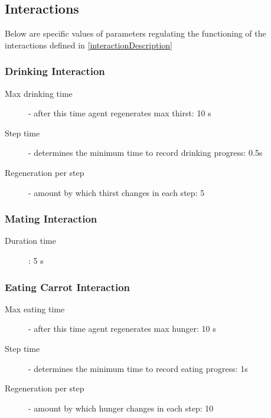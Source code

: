 \subsection{Interactions}
\label{interactionsImplementationDescription}
Below are specific values of parameters regulating the functioning of the interactions defined in \autoref{interactionDescription}

\subsubsection{Drinking Interaction}
\begin{description}
    \item[Max drinking time] - after this time agent regenerates max thirst: 10 s
    \item[Step time] - determines the minimum time to record drinking progress: 0.5s
    \item[Regeneration per step] - amount by which thirst changes in each step: 5
\end{description}

\subsubsection{Mating Interaction}
\begin{description}
    \item[Duration time]: 5 s
\end{description}

\subsubsection{Eating Carrot Interaction}
\begin{description}
    \item[Max eating time] - after this time agent regenerates max hunger: 10 s
    \item[Step time] - determines the minimum time to record eating progress: 1s
    \item[Regeneration per step] - amount by which hunger changes in each step: 10
\end{description}


